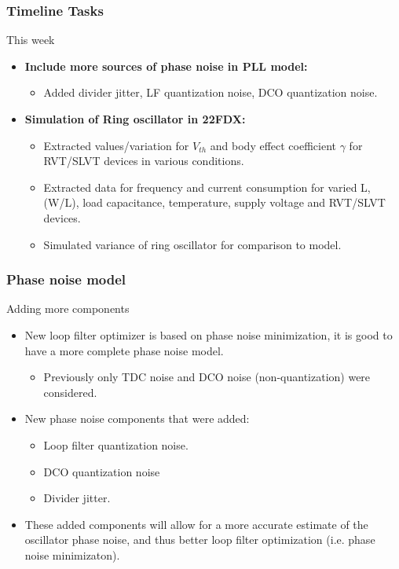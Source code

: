 \documentclass[t, screen, aspectratio=43]{beamer}
\begin{document}
\begin{frame}
	\frametitle{Timeline Tasks}
	\begin{block}{This week}
		\begin{itemize}
			\footnotesize
			\item \textbf{Include more sources of phase noise in PLL model:}
			\begin{itemize}
				\footnotesize
				\item Added divider jitter, LF quantization noise, DCO quantization noise.
			\end{itemize} 
			\item \textbf{Simulation of Ring oscillator in 22FDX:}
			\begin{itemize}
				\footnotesize
				\item Extracted values/variation for $V_{th}$ and body effect coefficient $\gamma$ for RVT/SLVT devices in various conditions.
				\item Extracted data for frequency and current consumption for varied L, (W/L), load capacitance, temperature, supply voltage and RVT/SLVT devices.
				\item Simulated variance of ring oscillator for comparison to model.
			\end{itemize} 
		\end{itemize}    
	\end{block}
\end{frame}


\begin{frame}
	\frametitle{Phase noise model}
	\begin{block}{Adding more components}
		\begin{itemize}
			\scriptsize
			\item New loop filter optimizer is based on phase noise minimization, it is good to have a more complete phase noise model.
			\begin{itemize}
				\scriptsize
				\item Previously only TDC noise and DCO noise (non-quantization) were considered.
			\end{itemize}
			\item New phase noise components that were added:
			\begin{itemize}
				\scriptsize
				\item Loop filter quantization noise.
				\item DCO quantization noise
				\item Divider jitter.
			\end{itemize}
			\item These added components will allow for a more accurate estimate of the oscillator phase noise, and thus better loop filter optimization (i.e. phase noise minimizaton).
		\end{itemize}    
	\end{block}
\end{frame}
\end{document}
